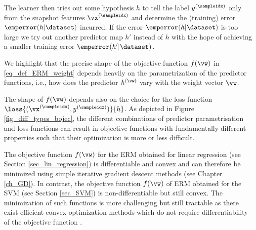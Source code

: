 \documentclass[12pt]{report}
\begin{document}
The learner then tries out some hypothesis $h$ to tell the label $y^{(\sampleidx)}$ 
only from the snapshot features $\vx^{(\sampleidx)}$ and determine the (training) 
error $\emperror(h|\dataset)$ incurred. If the error $\emperror(h|\dataset)$ 
is too large we try out another predictor map $h'$ instead of $h$ with the 
hope of achieving a smaller training error $\emperror(h'|\dataset)$. 

%

We highlight that the precise shape of the objective function 
$f(\vw)$ in \eqref{eq_def_ERM_weight} depends heavily on the 
parametrization of the predictor functions, i.e., how does the 
predictor $h^{(\vw)}$ vary with the weight vector $\vw$. 

The shape of $f(\vw)$ depends also on the choice for the loss 
function $\loss{(\vx^{(\sampleidx)},y^{(\sampleidx)})}{h}$. As 
depicted in Figure \ref{fig_diff_types_bojec}, the different combinations 
of predictor parametrisation and loss functions can result in objective 
functions with fundamentally different properties such that their 
optimization is more or less difficult. 

The objective function $f(\vw)$ for the ERM obtained for linear 
regression (see Section \ref{sec_lin_regression}) is differentiable 
and convex and can therefore be minimized using simple iterative 
gradient descent methods (see Chapter \ref{ch_GD}). In contrast, 
the objective function $f(\vw)$ of ERM obtained for the SVM (see 
Section \ref{sec_SVM}) is non-differentiable but still convex. The 
minimization of such functions is more challenging but still tractable 
as there exist efficient convex optimization methods which do not 
require differentiability of the objective function \cite{ProximalMethods}. 
\end{document}
